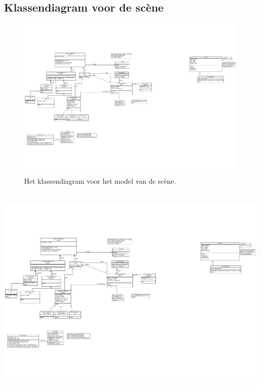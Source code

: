 \documentclass[a4paper,11pt, twoside]{article}
\begin{document}
    \subsection{Klassendiagram voor de sc\`ene}
    \begin{figure}[h]
        \centering
    	\includegraphics[height=0.72\textheight]{../Class-diagram/ClassDiagram1.pdf}
	\caption{Het klassendiagram voor het model van de sc\`ene.}
    \end{figure}
    \label{app:Scene}
    \FloatBarrier
    \newpage
     \ \\[5mm]
    \includegraphics[height=0.6\textheight]{../Class-diagram/ClassDiagram2.pdf}
    \newpage
\end{document}
